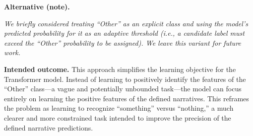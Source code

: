\medskip
\noindent\textbf{Alternative (note).}
\begin{notebox}\itshape
We briefly considered treating ``Other'' as an explicit class and using the model's predicted probability for it as an adaptive threshold (i.e., a candidate label must exceed the ``Other'' probability to be assigned). We leave this variant for future work.
\end{notebox}

\medskip
\noindent\textbf{Intended outcome.} This approach simplifies the learning objective for the Transformer model. Instead of learning to positively identify the features of the ``Other'' class---a vague and potentially unbounded task---the model can focus entirely on learning the positive features of the defined narratives. This reframes the problem as learning to recognize ``something'' versus ``nothing,'' a much clearer and more constrained task intended to improve the precision of the defined narrative predictions.


